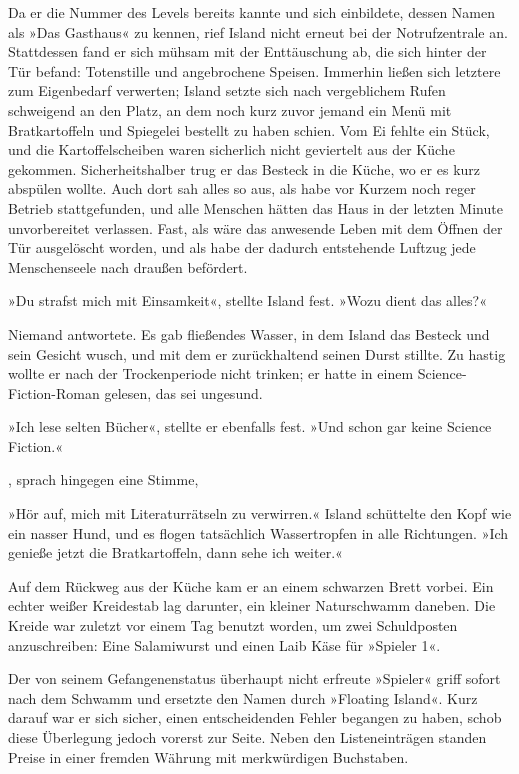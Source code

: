 Da er die Nummer des Levels bereits kannte und sich einbildete, dessen Namen als »Das Gasthaus« zu kennen, rief Island nicht erneut bei der Notrufzentrale an. Stattdessen fand er sich mühsam mit der Enttäuschung ab, die sich hinter der Tür befand: Totenstille und angebrochene Speisen. Immerhin ließen sich letztere zum Eigenbedarf verwerten; Island setzte sich nach vergeblichem Rufen schweigend an den Platz, an dem noch kurz zuvor jemand ein Menü mit Bratkartoffeln und Spiegelei bestellt zu haben schien. Vom Ei fehlte ein Stück, und die Kartoffelscheiben waren sicherlich nicht geviertelt aus der Küche gekommen. Sicherheitshalber trug er das Besteck in die Küche, wo er es kurz abspülen wollte. Auch dort sah alles so aus, als habe vor Kurzem noch reger Betrieb stattgefunden, und alle Menschen hätten das Haus in der letzten Minute unvorbereitet verlassen. Fast, als wäre das anwesende Leben mit dem Öffnen der Tür ausgelöscht worden, und als habe der dadurch entstehende Luftzug jede Menschenseele nach draußen befördert.

»Du strafst mich mit Einsamkeit«, stellte Island fest. »Wozu dient das alles?«

Niemand antwortete. Es gab fließendes Wasser, in dem Island das Besteck und sein Gesicht wusch, und mit dem er zurückhaltend seinen Durst stillte. Zu hastig wollte er nach der Trockenperiode nicht trinken; er hatte in einem Science-Fiction-Roman gelesen, das sei ungesund.

»Ich lese selten Bücher«, stellte er ebenfalls fest. »Und schon gar keine Science Fiction.«

, sprach hingegen eine Stimme, 

»Hör auf, mich mit Literaturrätseln zu verwirren.« Island schüttelte den Kopf wie ein nasser Hund, und es flogen tatsächlich Wassertropfen in alle Richtungen. »Ich genieße jetzt die Bratkartoffeln, dann sehe ich weiter.«

Auf dem Rückweg aus der Küche kam er an einem schwarzen Brett vorbei. Ein echter weißer Kreidestab lag darunter, ein kleiner Naturschwamm daneben. Die Kreide war zuletzt vor einem Tag benutzt worden, um zwei Schuldposten anzuschreiben: Eine Salamiwurst und einen Laib Käse für »Spieler 1«.

Der von seinem Gefangenenstatus überhaupt nicht erfreute »Spieler« griff sofort nach dem Schwamm und ersetzte den Namen durch »Floating Island«. Kurz darauf war er sich sicher, einen entscheidenden Fehler begangen zu haben, schob diese Überlegung jedoch vorerst zur Seite. Neben den Listeneinträgen standen Preise in einer fremden Währung mit merkwürdigen Buchstaben.


